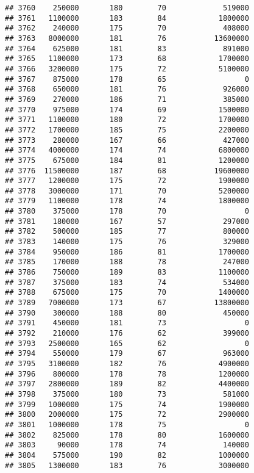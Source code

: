 \documentclass[
]{article}
\begin{document}
\begin{verbatim}
## 3760    250000       180        70             519000
## 3761   1100000       183        84            1800000
## 3762    240000       175        70             408000
## 3763   8000000       181        76           13600000
## 3764    625000       181        83             891000
## 3765   1100000       173        68            1700000
## 3766   3200000       175        72            5100000
## 3767    875000       178        65                  0
## 3768    650000       181        76             926000
## 3769    270000       186        71             385000
## 3770    975000       174        69            1500000
## 3771   1100000       180        72            1700000
## 3772   1700000       185        75            2200000
## 3773    280000       167        66             427000
## 3774   4000000       174        74            6800000
## 3775    675000       184        81            1200000
## 3776  11500000       187        68           19600000
## 3777   1200000       175        72            1900000
## 3778   3000000       171        70            5200000
## 3779   1100000       178        74            1800000
## 3780    375000       178        70                  0
## 3781    180000       167        57             297000
## 3782    500000       185        77             800000
## 3783    140000       175        76             329000
## 3784    950000       186        81            1700000
## 3785    170000       188        78             247000
## 3786    750000       189        83            1100000
## 3787    375000       183        74             534000
## 3788    675000       175        70            1400000
## 3789   7000000       173        67           13800000
## 3790    300000       188        80             450000
## 3791    450000       181        73                  0
## 3792    210000       176        62             399000
## 3793   2500000       165        62                  0
## 3794    550000       179        67             963000
## 3795   3100000       182        76            4900000
## 3796    800000       178        78            1200000
## 3797   2800000       189        82            4400000
## 3798    375000       180        73             581000
## 3799   1000000       175        74            1900000
## 3800   2000000       175        72            2900000
## 3801   1000000       178        75                  0
## 3802    825000       178        80            1600000
## 3803     90000       178        74             140000
## 3804    575000       190        82            1000000
## 3805   1300000       183        76            3000000

\end{verbatim}
\end{document}
